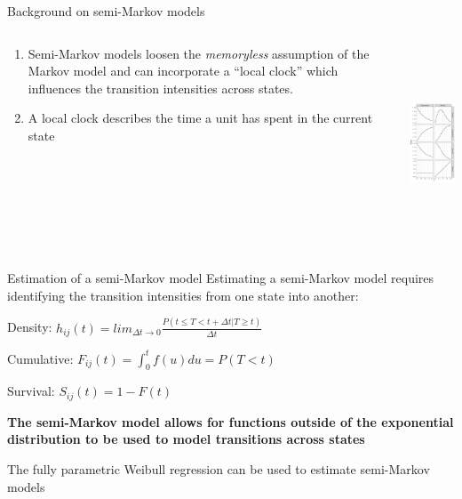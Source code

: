 \documentclass[
  ignorenonframetext,
]{beamer}
\providecommand{\tightlist}{%
  \setlength{\itemsep}{0pt}\setlength{\parskip}{0pt}}
\begin{document}
\begin{frame}{Background on semi-Markov models}
\label{background-on-semi-markov-models}
\begin{columns}[T]
\begin{column}{0.5\textwidth}
\begin{enumerate}
\tightlist
\item
  Semi-Markov models loosen the \emph{memoryless} assumption of the
  Markov model and can incorporate a ``local clock'' which influences
  the transition intensities across states.
\item
  A local clock describes the time a unit has spent in the current state
\end{enumerate}
\end{column}

\begin{column}{0.5\textwidth}
\includegraphics[width=\textwidth,height=2.29167in]{figures/weiExpFig.png}
\end{column}
\end{columns}
\end{frame}

\begin{frame}{Estimation of a semi-Markov model}
\label{estimation-of-a-semi-markov-model}
Estimating a semi-Markov model requires identifying the transition
intensities from one state into another:

Density:
\(h_{ij}(t) = lim_{\Delta t \rightarrow0}\frac{P(t\leq T < t + \Delta t | T \geq t)}{\Delta t}\)

Cumulative: \(F_{ij}(t) = \int_{0}^{t} f(u) du = P(T < t)\)

Survival: \(S_{ij}(t) = 1 - F(t)\)

\textbf{The semi-Markov model allows for functions outside of the
exponential distribution to be used to model transitions across states}

The fully parametric Weibull regression can be used to estimate
semi-Markov models
\end{frame}
\end{document}
